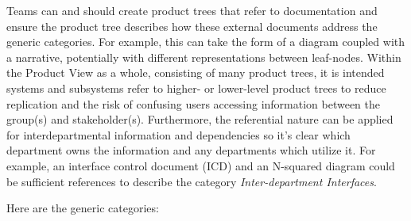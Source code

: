Teams can and should create product trees that refer to documentation and ensure the product tree describes how these external documents address the generic categories.
For example, this can take the form of a diagram coupled with a narrative, potentially with different representations between leaf-nodes.
Within the Product View as a whole, consisting of many product trees, it is intended systems and subsystems refer to higher- or lower-level product trees to reduce replication and the risk of confusing users accessing information between the group(s) and stakeholder(s).
Furthermore, the referential nature can be applied for interdepartmental information and dependencies so it's clear which department owns the information and any departments which utilize it.
For example, an interface control document (ICD) and an N-squared diagram could be sufficient references to describe the category \textit{Inter-department Interfaces}.

Here are the generic categories:

